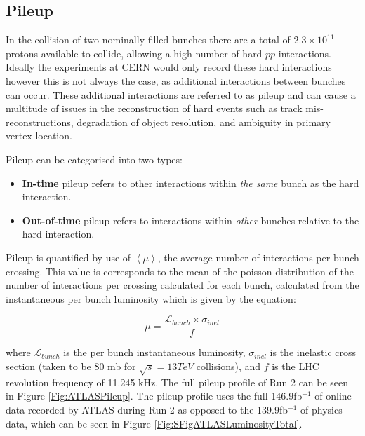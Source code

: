 \documentclass[12pt,a4paper,epsf,portrait,times,epsfig]{report}
\begin{document}

		\subsection{Pileup}\label{Section:Pileup}

		In the collision of two nominally filled bunches there are a total of $2.3 \times 10^{11}$ protons available to collide, allowing a high number of hard $pp$ interactions. Ideally the experiments at CERN would only record these hard interactions however this is not always the case, as additional interactions between bunches can occur. These additional interactions are referred to as pileup and can cause a multitude of issues in the reconstruction of hard events such as track mis-reconstructions, degradation of object resolution, and ambiguity in primary vertex location. \par
		
		Pileup can be categorised into two types:

		\begin{itemize}
			\item \textbf{In-time} pileup refers to other interactions within \textit{the same} bunch as the hard interaction.
			\item \textbf{Out-of-time} pileup refers to interactions within \textit{other} bunches relative to the hard interaction.   
		\end{itemize}

		Pileup is quantified by use of $\left\langle \mu \right\rangle$, the average number of interactions per bunch crossing. This value is corresponds to the mean of the poisson distribution of the number of interactions per crossing calculated for each bunch, calculated from the instantaneous per bunch luminosity which is given by the equation:

		\begin{equation}
			\mu = \frac{\mathcal{L}_{bunch}\times\sigma_{inel}}{f}
		\end{equation}

		where $\mathcal{L}_{bunch}$ is the per bunch instantaneous luminosity, $\sigma_{inel}$ is the inelastic cross section (taken to be 80 mb for $\sqrt{s}=13 TeV$ collisions), and $f$ is the LHC revolution frequency of 11.245 kHz. The full pileup profile of Run 2
		can be seen in Figure \ref{Fig:ATLASPileup}. The pileup profile uses the full 146.9fb$^{-1}$ of online data recorded by ATLAS during Run 2 as opposed to the 139.9fb$^{-1}$ of physics data, which can be seen in Figure \ref{Fig:SFigATLASLuminosityTotal}. 
\end{document}
